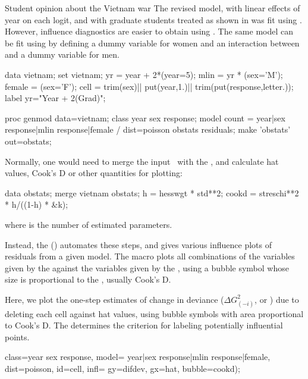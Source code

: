 \begin{Example}[vietnam3]{Student opinion about the Vietnam war}
The revised model, with linear effects of year on each logit,
and with graduate students treated as 
 shown in  was fit using
.  However, influence diagnostics are
easier to obtain using
.
The same model can be fit using  by defining a dummy variable
for women and an interaction between  and a dummy variable
for men.
\begin{listing}
data vietnam;
   set vietnam;
   yr = year + 2*(year=5);
   mlin =  yr * (sex='M');
   female = (sex='F');
   cell = trim(sex)|| put(year,1.)|| trim(put(response,letter.));
   label yr="Year + 2(Grad)";

proc genmod data=vietnam;
   class year sex response;
   model count = year|sex response|mlin  response|female /
         dist=poisson obstats residuals;
   make 'obstats' out=obstats;
\end{listing}
Normally, one would need to merge the input \Dset\ with the ,
and calculate hat values, Cook's D or other quantities for plotting:
\begin{listing}
data obstats;
   merge vietnam obstats;
   h = hesswgt * std**2;
   cookd = streschi**2 * h/((1-h) * &k);
\end{listing}
where  is the number of estimated parameters.

Instead, the  () automates these steps, and
gives various influence plots of residuals from a given
model.  The macro plots all combinations of the variables given
by the  against the variables given by the ,
using a bubble symbol whose size is proportional to the
, usually Cook's D.

Here, we plot the one-step estimates of change in deviance
($\Delta G_{(-i)}^2$, or )
due to deleting each cell against hat values,
using bubble symbols with area proportional to Cook's D.
The  determines the criterion for labeling
potentially influential points.
\begin{listing}
    class=year sex response,
    model= year|sex  response|mlin  response|female,
    dist=poisson, id=cell,
    infl=%
    gy=difdev, gx=hat, bubble=cookd);
\end{listing}


\end{Example}
